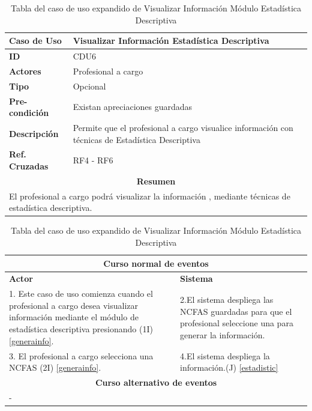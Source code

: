 \begin{table}
	\centering
	\begin{tabular}{|p{6cm} |p{6cm}|}
		\hline \textbf{Caso de Uso} & Visualizar Información Estadística Descriptiva \\ 
		\hline \textbf{ID} & CDU6 \\ 
		\hline \textbf{Actores} & Profesional a cargo \\ 
		\hline \textbf{Tipo} & Opcional \\ 
		\hline \textbf{Pre-condición} & Existan apreciaciones guardadas \\ 
		\hline \textbf{Descripción} & Permite que el profesional a cargo visualice información con técnicas de Estadística Descriptiva \\
		\hline \textbf{Ref. Cruzadas} & RF4 - RF6 \\ 
		\hline
		\multicolumn{2}{|c|}{\textbf{Resumen}} \\
		\hline
		\multicolumn{2}{|p{12cm}|}{El profesional a cargo podrá visualizar la información , mediante técnicas de estadística descriptiva.} \\
		\hline 
	\end{tabular}  
	\begin{tabular}{|p{6cm}|p{6cm}|}
		\multicolumn{2}{|c|}{\textbf{Curso normal de eventos}} \\
		\hline \textbf{Actor} & \textbf{Sistema} \\ 
		\hline 1. Este caso de uso comienza cuando el profesional a cargo desea visualizar información mediante el módulo de estadística descriptiva presionando (1I) \ref{generainfo}. & 2.El sistema despliega las NCFAS guardadas para que el profesional seleccione una para generar la información.  \\ 
		3. El profesional a cargo selecciona una NCFAS (2I) \ref{generainfo}. & 4.El sistema despliega la información.(J) \ref{estadistic}  \\ 
		\hline
		\multicolumn{2}{|c|}{\textbf{Curso alternativo de eventos}} \\
		\hline
		\multicolumn{2}{|p{12cm}|}{ - } \\
		\hline
	\end{tabular}
	\caption{Tabla del caso de uso expandido de Visualizar Información Módulo Estadística Descriptiva}
	\label{tabcdu66}

\end{table}
\clearpage


